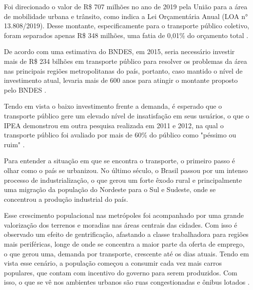 \begin{comment} 
    \section{Panorama econômico} 

\indent
\end{comment}
\par Foi direcionado o valor de R\$ 707 milhões no ano de 2019 pela União para a área de mobilidade urbana e trânsito, como indica a Lei Orçamentária Anual (LOA n° 13.808/2019). Desse montante, especificamente para o transporte público coletivo, foram separados apenas R\$ 348 milhões, uma fatia de 0,01\% do orçamento total \cite{NTUrbano}.
\par De acordo com uma estimativa do BNDES, em 2015, seria necessário investir mais de R\$ 234 bilhões em transporte público para resolver os problemas da área nas principais regiões metropolitanas do país, portanto, caso mantido o nível de investimento atual, levaria mais de 600 anos para atingir o montante proposto pelo BNDES \cite{Santos2015}.
\begin{comment} 
\section{Definição do problema}

\indent
\end{comment} 
\par Tendo em vista o baixo investimento frente a demanda, é esperado que o transporte público gere um elevado nível de insatisfação em seus usuários, o que o IPEA demonstrou em outra pesquisa realizada em 2011 e 2012, na qual o transporte público foi avaliado por mais de 60\% do público como "péssimo ou ruim"  \cite{Santos2015}.
\par Para entender a situação em que se encontra o transporte, o primeiro passo é olhar como o país se urbanizou. No último século, o Brasil passou por um intenso processo de industrialização, o que gerou um forte êxodo rural e principalmente uma migração da população do Nordeste para o Sul e Sudeste, onde se concentrou a produção industrial do país.
\par Esse crescimento populacional nas metrópoles foi acompanhado por uma grande valorização dos terrenos e moradias nas áreas centrais das cidades. Com isso é observado um efeito de gentrificação, afastando a classe trabalhadora para regiões mais periféricas, longe de onde se concentra a maior parte da oferta de emprego, o que gerou uma, demanda por transporte, crescente até os dias atuais.
Tendo em vista esse cenário, a população começou a consumir cada vez mais carros populares, que contam com incentivo do governo para serem produzidos. Com isso, o que se vê nos ambientes urbanos são ruas congestionadas e ônibus lotados \cite{PenaSD}.


